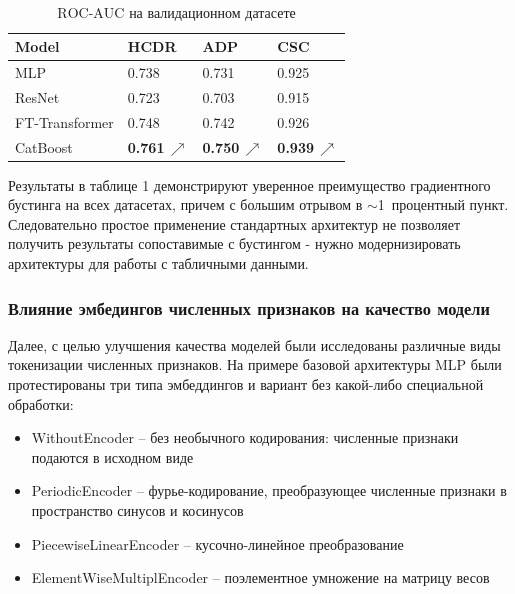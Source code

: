\documentclass[12pt]{article}
\begin{document}
\begingroup
  \renewcommand{\arraystretch}{0.8}
  \setlength{\tabcolsep}{6pt}
  \begin{table}[h]
    \caption{$\mathrm{ROC\text{-}AUC}$ на валидационном датасете} \\
    \vspace{6mm}
    \centering
    \begin{tabular}{@{}llll@{}}
      \hline
      Model         & HCDR    & ADP     & CSC      \\
      \hline
      MLP           & 0.738   & 0.731   & 0.925    \\
      ResNet        & 0.723   & 0.703   & 0.915    \\
      FT-Transformer& 0.748   & 0.742   & 0.926    \\
      CatBoost      & \textbf{0.761}\,\textcolor{OliveGreen}{$\nearrow$}
                    & \textbf{0.750}\,\textcolor{OliveGreen}{$\nearrow$}
                    & \textbf{0.939}\,\textcolor{OliveGreen}{$\nearrow$} \\
      \hline
    \end{tabular}
  \end{table}
\endgroup

Результаты в таблице 1 демонстрируют уверенное преимущество градиентного бустинга на всех датасетах, причем с большим отрывом в $\sim$1\, процентный пункт. Следовательно простое применение стандартных архитектур не позволяет получить результаты сопоставимые с бустингом - нужно модернизировать архитектуры для работы с табличными данными.


\subsubsection{Влияние эмбедингов численных признаков на качество модели}

\noindent Далее, с целью улучшения качества моделей были исследованы различные виды токенизации численных признаков. На примере базовой архитектуры MLP были протестированы три типа эмбеддингов и вариант без какой-либо специальной обработки:

\begin{itemize}
    \item WithoutEncoder -- без необычного кодирования: численные признаки подаются в исходном виде
    \item PeriodicEncoder -- фурье-кодирование, преобразующее численные  признаки в пространство синусов и косинусов
    \item PiecewiseLinearEncoder -- кусочно-линейное преобразование
    \item ElementWiseMultiplEncoder -- поэлементное умножение на матрицу весов
\end{itemize}
\end{document}
